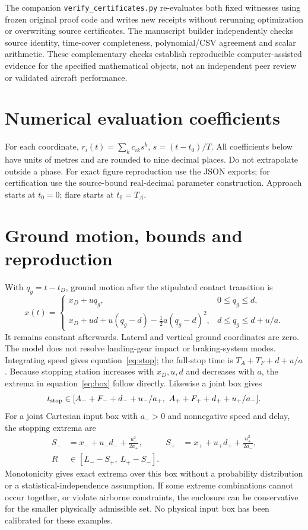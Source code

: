 The companion \texttt{verify\_\allowbreak certificates.py} re-evaluates both fixed witnesses using frozen original proof code and writes new receipts without rerunning optimization or overwriting source certificates. The manuscript builder independently checks source identity, time-cover completeness, polynomial/CSV agreement and scalar arithmetic. These complementary checks establish reproducible computer-assisted evidence for the specified mathematical objects, not an independent peer review or validated aircraft performance.
\par\medskip
\section{Numerical evaluation coefficients}\label{app:coefficients}
For each coordinate, $r_i(t)=\sum_k c_{ik}s^k$, $s=(t-t_0)/T$. All coefficients below have units of metres and are rounded to nine decimal places. Do not extrapolate outside a phase. For exact figure reproduction use the JSON exports; for certification use the source-bound real-decimal parameter construction. Approach starts at $t_0=0$; flare starts at $t_0=T_A$.

\section{Ground motion, bounds and reproduction}\label{app:ground}
With $q_g=t-t_D$, ground motion after the stipulated contact transition is
\[
x(t)=\begin{cases}
x_D+uq_g,&0\leq q_g\leq d,\\
x_D+ud+u(q_g-d)-\tfrac12a(q_g-d)^2,&d\leq q_g\leq d+u/a.
\end{cases}
\]
It remains constant afterwards. Lateral and vertical ground coordinates are zero. The model does not resolve landing-gear impact or braking-system modes. Integrating speed gives equation~\eqref{eq:stop}; the full-stop time is $T_A+T_F+d+u/a$. Because stopping station increases with $x_D,u,d$ and decreases with $a$, the extrema in equation~\eqref{eq:box} follow directly. Likewise a joint box gives
\[
t_{\rm stop}\in[A_-+F_-+d_-+u_-/a_+,\ A_++F_++d_++u_+/a_-].
\]
For a joint Cartesian input box with $a_->0$ and nonnegative speed and delay, the stopping extrema are
\begin{align}
S_-&=x_-+u_-d_-+\frac{u_-^2}{2a_+}, &
S_+&=x_++u_+d_++\frac{u_+^2}{2a_-},\\
R&\in[L_- - S_+,\ L_+ - S_-].
\label{eq:box}
\end{align}
Monotonicity gives exact extrema over this box without a probability distribution or a statistical-independence assumption. If some extreme combinations cannot occur together, or violate airborne constraints, the enclosure can be conservative for the smaller physically admissible set. No physical input box has been calibrated for these examples.

